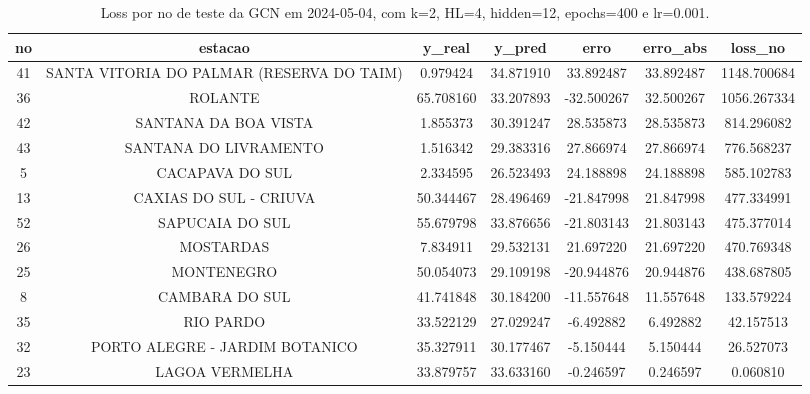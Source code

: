 \begin{table}[h]
\centering
\caption{Loss por no de teste da GCN em 2024-05-04, com k=2, HL=4, hidden=12, epochs=400 e lr=0.001.}
\label{tab:gcn_loss_k2_hl4_h12_e400_d20240504}
\begin{tabular}{ccccccc}
\toprule
no & estacao & y\_real & y\_pred & erro & erro\_abs & loss\_no \\
\midrule
41 & SANTA VITORIA DO PALMAR (RESERVA DO TAIM) & 0.979424 & 34.871910 & 33.892487 & 33.892487 & 1148.700684 \\
36 & ROLANTE & 65.708160 & 33.207893 & -32.500267 & 32.500267 & 1056.267334 \\
42 & SANTANA DA BOA VISTA & 1.855373 & 30.391247 & 28.535873 & 28.535873 & 814.296082 \\
43 & SANTANA DO LIVRAMENTO & 1.516342 & 29.383316 & 27.866974 & 27.866974 & 776.568237 \\
5 & CACAPAVA DO SUL & 2.334595 & 26.523493 & 24.188898 & 24.188898 & 585.102783 \\
13 & CAXIAS DO SUL - CRIUVA & 50.344467 & 28.496469 & -21.847998 & 21.847998 & 477.334991 \\
52 & SAPUCAIA DO SUL & 55.679798 & 33.876656 & -21.803143 & 21.803143 & 475.377014 \\
26 & MOSTARDAS & 7.834911 & 29.532131 & 21.697220 & 21.697220 & 470.769348 \\
25 & MONTENEGRO & 50.054073 & 29.109198 & -20.944876 & 20.944876 & 438.687805 \\
8 & CAMBARA DO SUL & 41.741848 & 30.184200 & -11.557648 & 11.557648 & 133.579224 \\
35 & RIO PARDO & 33.522129 & 27.029247 & -6.492882 & 6.492882 & 42.157513 \\
32 & PORTO ALEGRE - JARDIM BOTANICO & 35.327911 & 30.177467 & -5.150444 & 5.150444 & 26.527073 \\
23 & LAGOA VERMELHA & 33.879757 & 33.633160 & -0.246597 & 0.246597 & 0.060810 \\
\bottomrule
\end{tabular}
\end{table}
